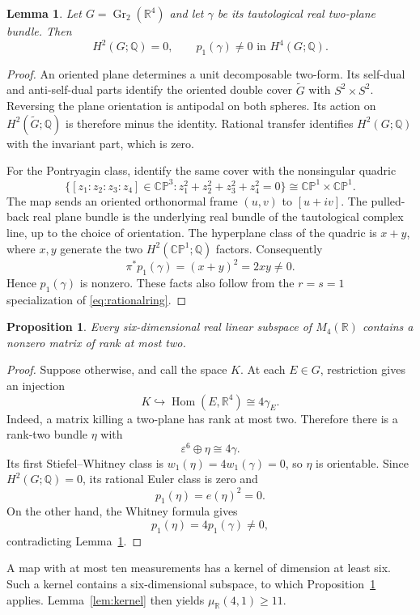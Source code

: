 \documentclass[11pt]{article}
\newtheorem{proposition}[theorem]{Proposition}
\newtheorem{lemma}[theorem]{Lemma}
\theoremstyle{definition}
\newcommand{\R}{\mathbb R}
\newcommand{\Q}{\mathbb Q}
\newcommand{\eps}{\varepsilon}
\newcommand{\Gr}{\operatorname{Gr}}
\newcommand{\Hom}{\operatorname{Hom}}
\newcommand{\muR}{\mu_{\R}}
\newcommand{\cp}{\mathbb{CP}}
\begin{document}
\begin{lemma}\label{lem:G24}
Let $G=\Gr_2(\R^4)$ and let $\gamma$ be its tautological real two-plane bundle. Then
\[
 H^2(G;\Q)=0,\qquad p_1(\gamma)\neq0\text{ in }H^4(G;\Q).
\]
\end{lemma}
\begin{proof}
An oriented plane determines a unit decomposable two-form. Its self-dual and anti-self-dual parts identify the oriented double cover $\widetilde G$ with $S^2\times S^2$. Reversing the plane orientation is antipodal on both spheres. Its action on $H^2(\widetilde G;\Q)$ is therefore minus the identity. Rational transfer identifies $H^2(G;\Q)$ with the invariant part, which is zero.

For the Pontryagin class, identify the same cover with the nonsingular quadric
\[
 \{[z_1:z_2:z_3:z_4]\in\cp^3:z_1^2+z_2^2+z_3^2+z_4^2=0\}
 \cong\cp^1\times\cp^1.
\]
The map sends an oriented orthonormal frame $(u,v)$ to $[u+iv]$. The pulled-back real plane bundle is the underlying real bundle of the tautological complex line, up to the choice of orientation. The hyperplane class of the quadric is $x+y$, where $x,y$ generate the two $H^2(\cp^1;\Q)$ factors. Consequently
\[
 \pi^*p_1(\gamma)=(x+y)^2=2xy\neq0.
\]
Hence $p_1(\gamma)$ is nonzero. These facts also follow from the $r=s=1$ specialization of \eqref{eq:rationalring}.
\end{proof}

\begin{proposition}\label{prop:ten}
Every six-dimensional real linear subspace of $M_4(\R)$ contains a nonzero matrix of rank at most two.
\end{proposition}
\begin{proof}
Suppose otherwise, and call the space $K$. At each $E\in G$, restriction gives an injection
\[
 K\hookrightarrow\Hom(E,\R^4)\cong4\gamma_E.
\]
Indeed, a matrix killing a two-plane has rank at most two. Therefore there is a rank-two bundle $\eta$ with
\[
 \eps^6\oplus\eta\cong4\gamma.
\]
Its first Stiefel--Whitney class is $w_1(\eta)=4w_1(\gamma)=0$, so $\eta$ is orientable. Since $H^2(G;\Q)=0$, its rational Euler class is zero and
\[
 p_1(\eta)=e(\eta)^2=0.
\]
On the other hand, the Whitney formula gives
\[
 p_1(\eta)=4p_1(\gamma)\neq0,
\]
contradicting Lemma~\ref{lem:G24}.
\end{proof}

A map with at most ten measurements has a kernel of dimension at least six. Such a kernel contains a six-dimensional subspace, to which Proposition~\ref{prop:ten} applies. Lemma~\ref{lem:kernel} then yields $\muR(4,1)\geq11$.
\end{document}
